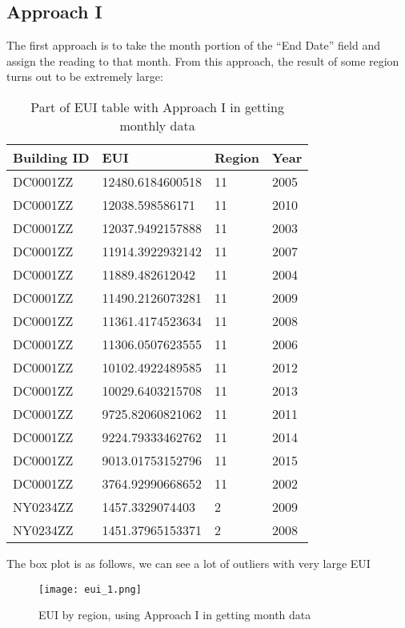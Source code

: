 \documentclass[12pt]{article}
\begin{document}
\subsection{Approach I}
The first approach is to take the month portion of the ``End Date''
field and assign the reading to that month. From this approach, the
result of some region turns out to be extremely large:
\begin{table}[h!]
\centering
\caption{Part of EUI table with Approach I in getting monthly data}
\label{my-label}
\begin{tabular}{llll}
Building ID & EUI              & Region & Year \\
  \hline
DC0001ZZ    & 12480.6184600518 & 11     & 2005 \\
DC0001ZZ    & 12038.598586171  & 11     & 2010 \\
DC0001ZZ    & 12037.9492157888 & 11     & 2003 \\
DC0001ZZ    & 11914.3922932142 & 11     & 2007 \\
DC0001ZZ    & 11889.482612042  & 11     & 2004 \\
DC0001ZZ    & 11490.2126073281 & 11     & 2009 \\
DC0001ZZ    & 11361.4174523634 & 11     & 2008 \\
DC0001ZZ    & 11306.0507623555 & 11     & 2006 \\
DC0001ZZ    & 10102.4922489585 & 11     & 2012 \\
DC0001ZZ    & 10029.6403215708 & 11     & 2013 \\
DC0001ZZ    & 9725.82060821062 & 11     & 2011 \\
DC0001ZZ    & 9224.79333462762 & 11     & 2014 \\
DC0001ZZ    & 9013.01753152796 & 11     & 2015 \\
DC0001ZZ    & 3764.92990668652 & 11     & 2002 \\
NY0234ZZ    & 1457.3329074403  & 2      & 2009 \\
NY0234ZZ    & 1451.37965153371 & 2      & 2008
\end{tabular}
\end{table}

The box plot is as follows, we can see a lot of outliers with very large EUI
\begin{figure}[h!]
  \centering
  \texttt{[image: eui\_1.png]}
  \caption{EUI by region, using Approach I in getting month data}
  \label{fig:eui_1}
\end{figure}
\end{document}
